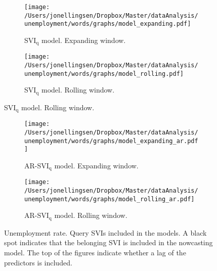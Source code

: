 \begin{figure}[ht]
    \centering
    \begin{subfigure}[b]{\textwidth}
\caption{SVI$_{\text{q}}$ model. Expanding window.}
        \texttt{[image: /Users/jonellingsen/Dropbox/Master/dataAnalysis/unemployment/words/graphs/model\_expanding.pdf]}
    \end{subfigure}
    \begin{subfigure}[b]{\textwidth}
\caption{SVI$_{\text{q}}$ model. Rolling window.}
        \texttt{[image: /Users/jonellingsen/Dropbox/Master/dataAnalysis/unemployment/words/graphs/model\_rolling.pdf]}
    \end{subfigure}
\end{figure}
\begin{figure}\ContinuedFloat
\begin{subfigure}[b]{\textwidth}
 \caption{AR-SVI$_{\text{q}}$ model. Expanding window.}        
\texttt{[image: /Users/jonellingsen/Dropbox/Master/dataAnalysis/unemployment/words/graphs/model\_expanding\_ar.pdf]}
    \end{subfigure}
\begin{subfigure}[b]{\textwidth}
\caption{AR-SVI$_{\text{q}}$ model. Rolling window.}        
\texttt{[image: /Users/jonellingsen/Dropbox/Master/dataAnalysis/unemployment/words/graphs/model\_rolling\_ar.pdf]}
    \end{subfigure}
\caption{Unemployment rate. Query SVIs included in the models. A black spot indicates that the belonging SVI is included in the nowcasting model. The top of the figures indicate whether a lag of the predictors is included.}
\label{model_queries_urate}
\end{figure}